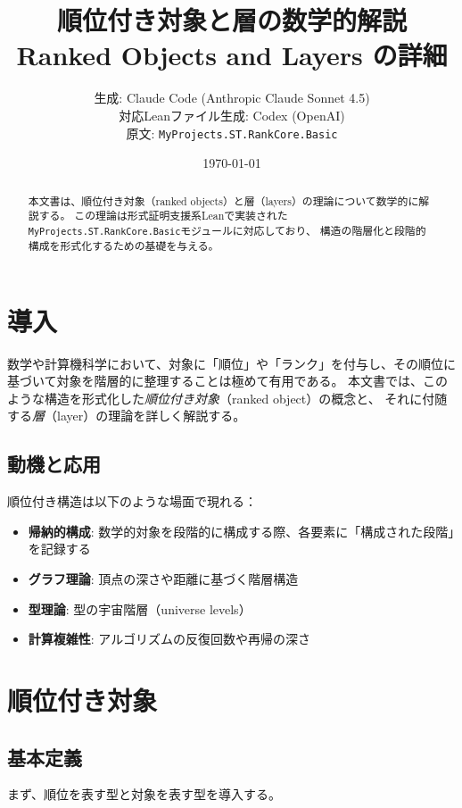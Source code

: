 \documentclass[12pt,a4paper]{ltjsarticle}
\title{順位付き対象と層の数学的解説\\
\large Ranked Objects and Layers の詳細}
\author{%
  生成: Claude Code (Anthropic Claude Sonnet 4.5)\\
  対応Leanファイル生成: Codex (OpenAI)\\
  原文: \texttt{MyProjects.ST.RankCore.Basic}
}
\date{\today}
\theoremstyle{definition}
\begin{document}
\maketitle

\begin{abstract}
本文書は、順位付き対象（ranked objects）と層（layers）の理論について数学的に解説する。
この理論は形式証明支援系Leanで実装された\texttt{MyProjects.ST.RankCore.Basic}モジュールに対応しており、
構造の階層化と段階的構成を形式化するための基礎を与える。
\end{abstract}

\tableofcontents

\section{導入}

数学や計算機科学において、対象に「順位」や「ランク」を付与し、その順位に基づいて対象を階層的に整理することは極めて有用である。
本文書では、このような構造を形式化した\emph{順位付き対象}（ranked object）の概念と、
それに付随する\emph{層}（layer）の理論を詳しく解説する。

\subsection{動機と応用}

順位付き構造は以下のような場面で現れる：

\begin{itemize}[leftmargin=*]
  \item \textbf{帰納的構成}: 数学的対象を段階的に構成する際、各要素に「構成された段階」を記録する
  \item \textbf{グラフ理論}: 頂点の深さや距離に基づく階層構造
  \item \textbf{型理論}: 型の宇宙階層（universe levels）
  \item \textbf{計算複雑性}: アルゴリズムの反復回数や再帰の深さ
\end{itemize}

\section{順位付き対象}
\label{sec:ranked}

\subsection{基本定義}

まず、順位を表す型と対象を表す型を導入する。
\end{document}
